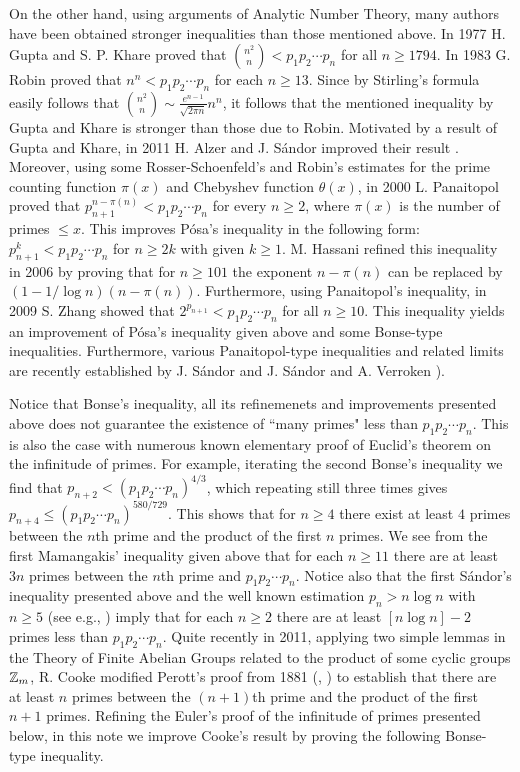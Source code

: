 \documentclass[12pt]{amsart}
\begin{document}
On the other hand, using arguments  of Analytic Number Theory,
many authors have been obtained stronger inequalities than 
those mentioned above. 
In 1977 H. Gupta and S. P. Khare \cite{gk} 
proved that ${n^2\choose n}<p_1p_2\cdots p_n$ for all $n\ge 1794$. 
In 1983 G. Robin \cite[Th\'{e}or\`{e}me 4]{rob} proved that 
$n^n<p_1p_2\cdots p_n$ for each $n\ge 13$. 
Since by Stirling's formula easily follows that 
${n^2\choose n}\sim \frac{e^{n-1}}{\sqrt{2\pi n}}n^n$, it 
follows that the mentioned  inequality by Gupta and  Khare
is stronger than  those due to  Robin.
Motivated by a result of Gupta and Khare, in 2011 H. Alzer and J. S\'{a}ndor 
improved their result \cite[Theorem]{as}.
Moreover, using some Rosser-Schoenfeld's \cite{rs1} and  Robin's estimates 
\cite{rob} for the prime counting function $\pi(x)$
and Chebyshev function $\theta(x)$, in 2000  L. Panaitopol 
\cite{pa1} proved that $p_{n+1}^{n-\pi(n)}<p_1p_2\cdots p_n$ for every 
$n\ge 2$, where $\pi(x)$ is the number of primes $\le x$. 
This improves P\'{o}sa's inequality in the following form: 
$p_{n+1}^k<p_1p_2\cdots p_n$ for $n\ge 2k$ with given $k\ge 1$.
M. Hassani \cite{ha1} refined this inequality in 2006 by proving that for 
$n\ge 101$ the exponent $n-\pi(n)$ can be replaced by 
$(1-1/\log n)(n-\pi(n))$. 
Furthermore, using Panaitopol's  inequality, in  2009
 S.   Zhang showed \cite[Corollary 1]{zh} 
that $2^{p_{n+1}}<p_1p_2\cdots p_n$ for all $n\ge 10$.
This inequality yields an improvement of P\'{o}sa's inequality \cite{pos} 
given above and some Bonse-type inequalities. Furthermore,
various Panaitopol-type  inequalities and related limits are recently 
established by J. S\'{a}ndor \cite{sa2} and  J. S\'{a}ndor 
and A. Verroken \cite{sv}). 
   
Notice that Bonse's inequality, all its refinemenets and improvements 
presented above does not guarantee the existence of  ``many primes" 
less than $p_1p_2\cdots p_n$.  This is also the case with
numerous known elementary proof of Euclid's theorem on the infinitude of 
primes. For example, iterating  the second Bonse's inequality 
we find that $p_{n+2}< (p_1p_2\cdots p_n)^{4/3}$, which repeating
still three  times gives $p_{n+4}\le (p_1p_2\cdots p_n)^{580/729}$. 
This shows that for $n\ge 4$ there exist at least 
$4$ primes between the $n$th prime and the product of the first $n$ primes.
We see from the first Mamangakis'  inequality given above 
that for each  $n\ge 11$ there are at least $3n$ primes  between the $n$th 
prime and $p_1p_2\cdots p_n$. Notice also that the first  S\'{a}ndor's 
inequality presented above and the well known estimation $p_n>n\log n$ with 
$n\ge 5$ (see e.g., \cite[(3.10) in Theorem 3]{rs1}) 
imply that for each $n\ge 2$ there are  at least 
$[n\log n]-2$ primes less than $p_1p_2\cdots p_n$. 
 Quite recently in 2011, applying two simple lemmas in 
the Theory of Finite Abelian Groups related to 
the product of some cyclic groups $\Bbb Z_m$, R. Cooke \cite{c}  
modified Perott's proof from 1881 (\cite{pe}, \cite[page 10]{r2})
to establish that there are at least $n$ primes between the 
$(n+1)$th prime and the product of the first $n+1$ primes. 
Refining the Euler's proof of the infinitude of primes presented below, 
in this note we  improve Cooke's result by proving the following
Bonse-type inequality.
\end{document}

